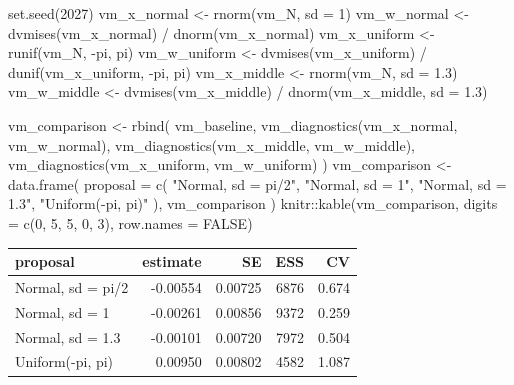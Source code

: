 \documentclass[
  letterpaper,
  DIV=11,
  numbers=noendperiod]{scrartcl}
\newenvironment{Shaded}{\begin{snugshade}}{\end{snugshade}}
\newcommand{\AttributeTok}[1]{\textcolor[rgb]{0.40,0.45,0.13}{#1}}
\newcommand{\ConstantTok}[1]{\textcolor[rgb]{0.56,0.35,0.01}{#1}}
\newcommand{\DecValTok}[1]{\textcolor[rgb]{0.68,0.00,0.00}{#1}}
\newcommand{\FloatTok}[1]{\textcolor[rgb]{0.68,0.00,0.00}{#1}}
\newcommand{\FunctionTok}[1]{\textcolor[rgb]{0.28,0.35,0.67}{#1}}
\newcommand{\NormalTok}[1]{\textcolor[rgb]{0.00,0.23,0.31}{#1}}
\newcommand{\OtherTok}[1]{\textcolor[rgb]{0.00,0.23,0.31}{#1}}
\newcommand{\SpecialCharTok}[1]{\textcolor[rgb]{0.37,0.37,0.37}{#1}}
\newcommand{\StringTok}[1]{\textcolor[rgb]{0.13,0.47,0.30}{#1}}
\newcounter{none} %
\begin{document}
\begin{Shaded}
\begin{Highlighting}[]
\FunctionTok{set.seed}\NormalTok{(}\DecValTok{2027}\NormalTok{)}
\NormalTok{vm\_x\_normal }\OtherTok{\textless{}{-}} \FunctionTok{rnorm}\NormalTok{(vm\_N, }\AttributeTok{sd =} \DecValTok{1}\NormalTok{)}
\NormalTok{vm\_w\_normal }\OtherTok{\textless{}{-}} \FunctionTok{dvmises}\NormalTok{(vm\_x\_normal) }\SpecialCharTok{/} \FunctionTok{dnorm}\NormalTok{(vm\_x\_normal)}
\NormalTok{vm\_x\_uniform }\OtherTok{\textless{}{-}} \FunctionTok{runif}\NormalTok{(vm\_N, }\SpecialCharTok{{-}}\NormalTok{pi, pi)}
\NormalTok{vm\_w\_uniform }\OtherTok{\textless{}{-}} \FunctionTok{dvmises}\NormalTok{(vm\_x\_uniform) }\SpecialCharTok{/}
  \FunctionTok{dunif}\NormalTok{(vm\_x\_uniform, }\SpecialCharTok{{-}}\NormalTok{pi, pi)}
\NormalTok{vm\_x\_middle }\OtherTok{\textless{}{-}} \FunctionTok{rnorm}\NormalTok{(vm\_N, }\AttributeTok{sd =} \FloatTok{1.3}\NormalTok{)}
\NormalTok{vm\_w\_middle }\OtherTok{\textless{}{-}} \FunctionTok{dvmises}\NormalTok{(vm\_x\_middle) }\SpecialCharTok{/} \FunctionTok{dnorm}\NormalTok{(vm\_x\_middle, }\AttributeTok{sd =} \FloatTok{1.3}\NormalTok{)}

\NormalTok{vm\_comparison }\OtherTok{\textless{}{-}} \FunctionTok{rbind}\NormalTok{(}
\NormalTok{  vm\_baseline,}
  \FunctionTok{vm\_diagnostics}\NormalTok{(vm\_x\_normal, vm\_w\_normal),}
  \FunctionTok{vm\_diagnostics}\NormalTok{(vm\_x\_middle, vm\_w\_middle),}
  \FunctionTok{vm\_diagnostics}\NormalTok{(vm\_x\_uniform, vm\_w\_uniform)}
\NormalTok{)}
\NormalTok{vm\_comparison }\OtherTok{\textless{}{-}} \FunctionTok{data.frame}\NormalTok{(}
  \AttributeTok{proposal =} \FunctionTok{c}\NormalTok{(}
    \StringTok{"Normal, sd = pi/2"}\NormalTok{, }\StringTok{"Normal, sd = 1"}\NormalTok{,}
    \StringTok{"Normal, sd = 1.3"}\NormalTok{, }\StringTok{"Uniform({-}pi, pi)"}
\NormalTok{  ),}
\NormalTok{  vm\_comparison}
\NormalTok{)}
\NormalTok{knitr}\SpecialCharTok{::}\FunctionTok{kable}\NormalTok{(vm\_comparison, }\AttributeTok{digits =} \FunctionTok{c}\NormalTok{(}\DecValTok{0}\NormalTok{, }\DecValTok{5}\NormalTok{, }\DecValTok{5}\NormalTok{, }\DecValTok{0}\NormalTok{, }\DecValTok{3}\NormalTok{), }\AttributeTok{row.names =} \ConstantTok{FALSE}\NormalTok{)}
\end{Highlighting}
\end{Shaded}

{\def\LTcaptype{none} %
\begin{longtable}[]{@{}lrrrr@{}}
\toprule\noalign{}
proposal & estimate & SE & ESS & CV \\
\midrule\noalign{}
\endhead
\bottomrule\noalign{}
\endlastfoot
Normal, sd = pi/2 & -0.00554 & 0.00725 & 6876 & 0.674 \\
Normal, sd = 1 & -0.00261 & 0.00856 & 9372 & 0.259 \\
Normal, sd = 1.3 & -0.00101 & 0.00720 & 7972 & 0.504 \\
Uniform(-pi, pi) & 0.00950 & 0.00802 & 4582 & 1.087 \\
\end{longtable}
}
\end{document}
